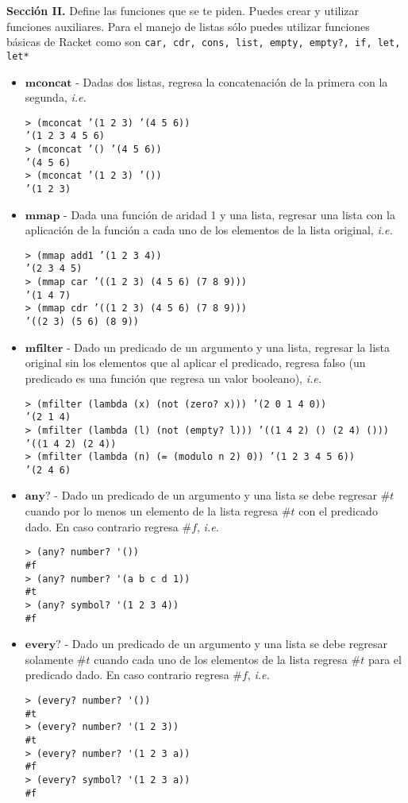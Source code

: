 \documentclass{article}
\begin{document}
\textbf{Sección II.} Define las funciones que se te piden. Puedes crear
y utilizar funciones auxiliares. Para el manejo de listas sólo puedes
utilizar funciones básicas de Racket como son \texttt{car, cdr, cons,
  list, empty, empty?, if, let, let*}

\begin{itemize}
\item $\textbf{mconcat}$ - Dadas dos listas, regresa la concatenación
  de la primera con la segunda, \textit{i.e.}
\begin{verbatim}
> (mconcat ’(1 2 3) ’(4 5 6))
’(1 2 3 4 5 6)
> (mconcat ’() ’(4 5 6))
’(4 5 6)
> (mconcat ’(1 2 3) ’())
’(1 2 3)
\end{verbatim}

\item $\textbf{mmap}$ - Dada una función de aridad 1 y una lista,
  regresar una lista con la aplicación de la función a cada uno de los
  elementos de la lista original, \textit{i.e.}
\begin{verbatim}
> (mmap add1 ’(1 2 3 4))
’(2 3 4 5)
> (mmap car ’((1 2 3) (4 5 6) (7 8 9)))
’(1 4 7)
> (mmap cdr ’((1 2 3) (4 5 6) (7 8 9)))
’((2 3) (5 6) (8 9))
\end{verbatim}

\item $\textbf{mfilter}$ - Dado un predicado de un argumento y una
  lista, regresar la lista original sin los elementos que al aplicar
  el predicado, regresa falso (un predicado es una función que
  regresa un valor booleano), \textit{i.e.}
\begin{verbatim}
> (mfilter (lambda (x) (not (zero? x))) ’(2 0 1 4 0))
’(2 1 4)
> (mfilter (lambda (l) (not (empty? l))) ’((1 4 2) () (2 4) ()))
’((1 4 2) (2 4))
> (mfilter (lambda (n) (= (modulo n 2) 0)) ’(1 2 3 4 5 6))
’(2 4 6)
\end{verbatim}

\item $\textbf{any?}$ - Dado un predicado de un argumento y
  una lista se debe regresar $\#t$ cuando por lo menos un
  elemento de la lista regresa $\#t$ con el predicado dado.
  En caso contrario regresa $\#f$, \textit{i.e.}
\begin{verbatim}
> (any? number? '())
#f
> (any? number? '(a b c d 1))
#t
> (any? symbol? '(1 2 3 4))
#f
\end{verbatim}

\item $\textbf{every?}$ - Dado un predicado de un argumento y
  una lista se debe regresar solamente $\#t$ cuando cada uno
  de los elementos de la lista regresa $\#t$ para el predicado dado.
  En caso contrario regresa $\#f$, \textit{i.e.}
\begin{verbatim}
> (every? number? '())
#t
> (every? number? '(1 2 3))
#t
> (every? number? '(1 2 3 a))
#f
> (every? symbol? '(1 2 3 a))
#f
\end{verbatim}


\end{itemize}
\end{document}
